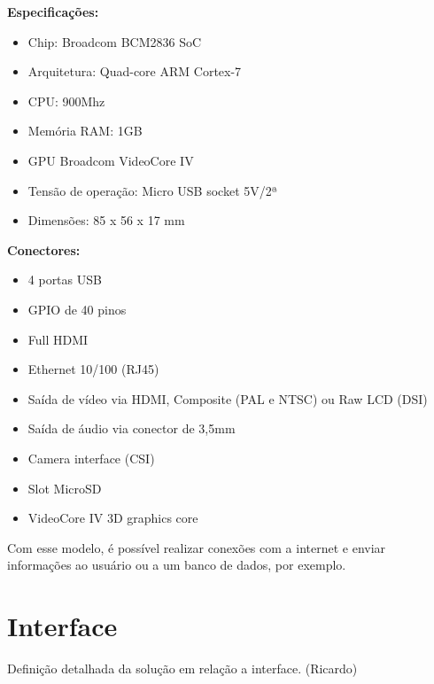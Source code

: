  \textbf{Especificações:}
  \begin{itemize}                                                     
    \item Chip: Broadcom BCM2836 SoC
    \item Arquitetura: Quad-core ARM Cortex-7
    \item CPU: 900Mhz
    \item Memória RAM: 1GB
    \item GPU Broadcom VideoCore IV
    \item Tensão de operação: Micro USB socket 5V/2ª
    \item Dimensões: 85 x 56 x 17 mm
 \end{itemize}                                                       
  
  \textbf{Conectores:}
  \begin{itemize}                                                     
    \item 4 portas USB
    \item GPIO de 40 pinos
    \item Full HDMI
    \item Ethernet 10/100 (RJ45)
    \item Saída de vídeo via HDMI, Composite (PAL e NTSC) ou Raw LCD (DSI)
    \item Saída de áudio via conector de 3,5mm
    \item Camera interface (CSI)
    \item Slot MicroSD
    \item VideoCore IV 3D graphics core
  \end{itemize}

  Com esse modelo, é possível realizar conexões com a internet e enviar informações ao usuário ou a um banco de dados, por exemplo.


\section{Interface} %
\label{sub:interface}
	Definição detalhada da solução em relação a interface. (Ricardo)
